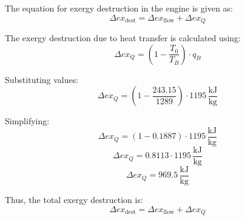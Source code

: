 The equation for exergy destruction in the engine is given as:  
\[
\Delta ex_{\text{dest}} = \Delta ex_{\text{flow}} + \Delta ex_Q
\]  

The exergy destruction due to heat transfer is calculated using:  
\[
\Delta ex_Q = \left( 1 - \frac{T_0}{T_B} \right) \cdot q_B
\]  

Substituting values:  
\[
\Delta ex_Q = \left( 1 - \frac{243.15}{1289} \right) \cdot 1195 \, \frac{\text{kJ}}{\text{kg}}
\]  

Simplifying:  
\[
\Delta ex_Q = \left( 1 - 0.1887 \right) \cdot 1195 \, \frac{\text{kJ}}{\text{kg}}
\]  
\[
\Delta ex_Q = 0.8113 \cdot 1195 \, \frac{\text{kJ}}{\text{kg}}
\]  
\[
\Delta ex_Q = 969.5 \, \frac{\text{kJ}}{\text{kg}}
\]  

Thus, the total exergy destruction is:  
\[
\Delta ex_{\text{dest}} = \Delta ex_{\text{flow}} + \Delta ex_Q
\]